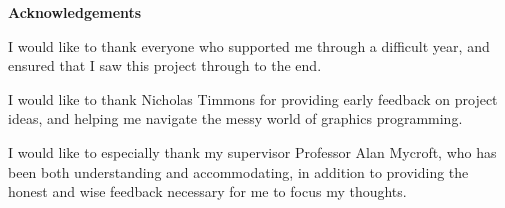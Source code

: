 \newpage
{\Huge \bf Acknowledgements}
\vspace{24pt}

I would like to thank everyone who supported me through a difficult year, and
ensured that I saw this project through to the end.

I would like to thank Nicholas Timmons for providing early feedback on project
ideas, and helping me navigate the messy world of graphics programming.

I would like to especially thank my supervisor Professor Alan Mycroft, who has
been both understanding and accommodating, in addition to providing the honest
and wise feedback necessary for me to focus my thoughts.

\newpage
\vspace*{\fill}
